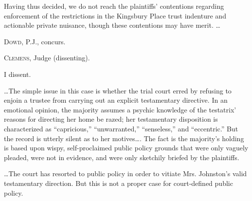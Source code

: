 Having thus decided, we do not reach the plaintiffs' contentions regarding
enforcement of the restrictions in the Kingsbury Place trust indenture and
actionable private nuisance, though these contentions may have
merit. \ldots

\textsc{Dowd}, P.J., concurs.

\opinion\textsc{Clemens}, Judge (dissenting).

I dissent.

\ldots The simple issue in this case is whether the trial court erred by
refusing to enjoin a trustee from carrying out an explicit testamentary
directive. In an emotional opinion, the majority assumes a psychic knowledge of
the testatrix' reasons for directing her home be razed; her testamentary
disposition is characterized as ``capricious,'' ``unwarranted,'' ``senseless,''
and ``eccentric.'' But the record is utterly silent as to her motives\ldots. The
fact is the majority's holding is based upon wispy, self-proclaimed public
policy grounds that were only vaguely pleaded, were not in evidence, and were
only sketchily briefed by the plaintiffs.

\ldots The court has resorted to public policy in order to vitiate Mrs.
Johnston's valid testamentary direction. But this is not a proper case for
court-defined public policy.

